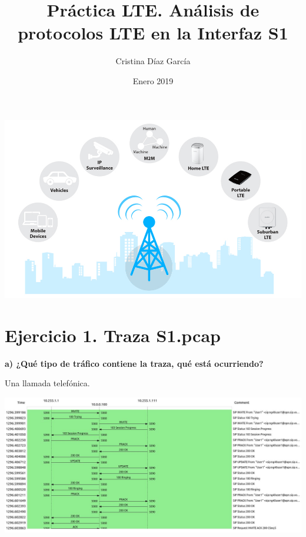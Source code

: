 \documentclass{article}
\title{Práctica	LTE. Análisis de protocolos LTE	en la Interfaz S1}
\author{Cristina Díaz García}
\date{Enero 2019}
\begin{document}

\begin{titlingpage}
\maketitle

\begin{center}
\includegraphics[scale=1.5]{images/lte.jpg} 
\end{center}

\end{titlingpage}

\newpage

\tableofcontents

\newpage

\section{Ejercicio 1. Traza S1.pcap}

\textbf{a) ¿Qué tipo de tráfico contiene la traza, qué está ocurriendo?}

Una llamada telefónica.

\begin{center}
\includegraphics[scale=0.3]{images/call.jpg}
\end{center}
\end{document}
